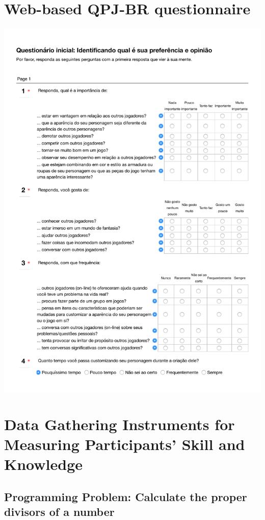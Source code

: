 
\chapter{Web-based QPJ-BR questionnaire}
\label{annex:QPJ-BR-questionnaire}
\includegraphics[width=1\textwidth]{images/annex/QPJ-BR-questionnaire.pdf}

\chapter{Data Gathering Instruments for Measuring Participants' Skill and Knowledge}
\label{annex:data-gathering-instruments-skill-knowledge}

\newpage
\section{Programming Problem: Calculate the proper divisors of a number}
\label{annex:pilot-study-p1}

